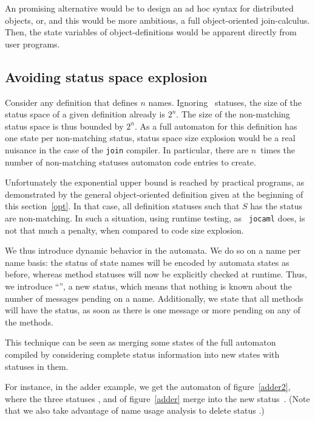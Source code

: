 An promising alternative would be to design an ad hoc syntax for
distributed objects, or, and this would be more ambitious, a full
object-oriented join-calculus. Then, the state variables of
object-definitions would be apparent directly from user programs.



\subsection{Avoiding status space explosion}\label{space}

Consider any definition that defines $n$ names.  Ignoring
~statuses, the size of the status space of a given
definition already is $2^n$.  The size of the non-matching status
space is thus bounded by $2^n$.  As a full automaton for this
definition has one state per non-matching status, status space size
explosion would be a real nuisance in the case of the {\tt join}
compiler.  In particular, there are $n$~times the number of
non-matching statuses automaton code entries to create.

Unfortunately the exponential upper bound is reached by practical
programs, as demonstrated by the general object-oriented definition
given at the beginning of this section~\ref{opt}.  In that case, all
definition statuses such that $S$ has the  status are
non-matching.  In such a situation, using runtime testing, as {\tt
  jocaml} does, is not that much a penalty, when compared to code size
explosion.

We thus introduce dynamic behavior in the automata.  We do so on a
name per name basis: the status of state names will be encoded by
automata states as before, whereas method statuses will now be
explicitly checked at runtime.  Thus, we introduce ``'', a
new status, which means that nothing is known about the number of
messages pending on a name.  Additionally, we state that all methods
will have the  status, as soon as there is one message or
more pending on any of the methods.

This technique can be seen as merging some states of
the full automaton compiled by considering complete status
information into new states with  statuses in them.

For instance, in the adder example, we get the automaton of
figure~\ref{adder2}, where the three statuses ,
 and  of figure~\ref{adder} merge into the new
status~.  (Note that we also take advantage of name usage
analysis to delete status .)

